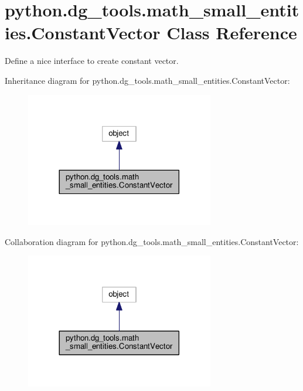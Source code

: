 \hypertarget{classpython_1_1dg__tools_1_1math__small__entities_1_1ConstantVector}{}\section{python.\+dg\+\_\+tools.\+math\+\_\+small\+\_\+entities.\+Constant\+Vector Class Reference}
\label{classpython_1_1dg__tools_1_1math__small__entities_1_1ConstantVector}


Define a nice interface to create constant vector.  




Inheritance diagram for python.\+dg\+\_\+tools.\+math\+\_\+small\+\_\+entities.\+Constant\+Vector\+:
\nopagebreak
\begin{figure}[H]
\begin{center}
\leavevmode
\includegraphics[width=233pt]{classpython_1_1dg__tools_1_1math__small__entities_1_1ConstantVector__inherit__graph}
\end{center}
\end{figure}


Collaboration diagram for python.\+dg\+\_\+tools.\+math\+\_\+small\+\_\+entities.\+Constant\+Vector\+:
\nopagebreak
\begin{figure}[H]
\begin{center}
\leavevmode
\includegraphics[width=233pt]{classpython_1_1dg__tools_1_1math__small__entities_1_1ConstantVector__coll__graph}
\end{center}
\end{figure}
